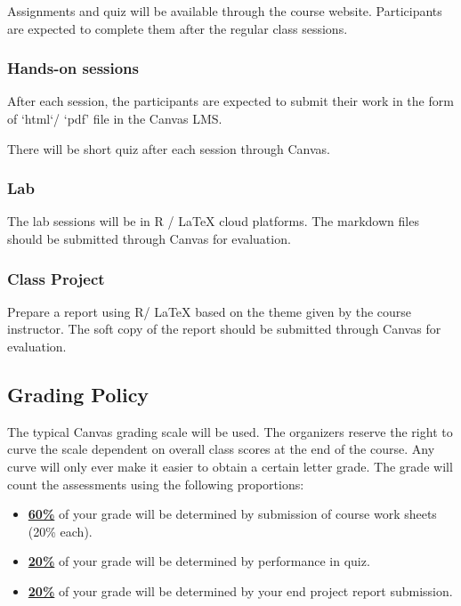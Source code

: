 \documentclass[11pt]{article}
\begin{document}
Assignments and quiz will be available through the course website. Participants are expected to complete them after the regular class sessions.

\subsubsection*{Hands-on sessions}
After each session, the participants are expected to submit their work in the form of `html`/ `pdf' file in the Canvas LMS.

There will be short quiz after each session through Canvas.
\subsubsection*{Lab}
The lab sessions will be in R / \LaTeX{} cloud platforms. The markdown files should be submitted through Canvas for evaluation.

\subsubsection*{Class Project}
Prepare a report using R/ \LaTeX{} based on the theme given by the course instructor. The soft copy of the report should be submitted through Canvas for evaluation.

\subsection*{Grading Policy}
The typical Canvas grading scale will be used. The organizers reserve the right to curve the scale dependent on overall class scores at the end of the course. Any curve will only ever make it easier to obtain a certain letter grade. The grade will count the assessments using the following proportions:
\begin{itemize}
	\item \underline{\textbf{60\%}} of your grade will be determined by submission of course work sheets (20\% each).
	\item \underline{\textbf{20\%}} of your grade will be determined by performance in quiz.
	\item \underline{\textbf{20\%}} of your grade will be determined by your end project report submission.
\end{itemize}


\end{document}
